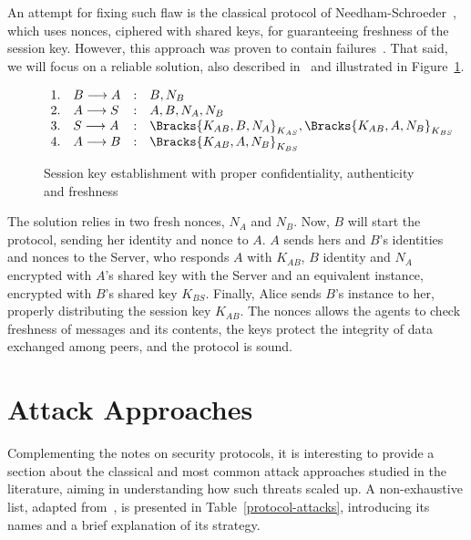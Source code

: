 An attempt for fixing such flaw is the classical protocol of Needham-Schroeder~\cite{NeedhamSchroeder78}, which uses nonces, ciphered with shared keys, for guaranteeing freshness of the session key. However, this approach was proven to contain failures~\cite{Lowe96}. That said, we will focus on a reliable solution, also described in~\cite{BoydMathuria2008} and illustrated in Figure~\ref{prt:session-key-complete}.

\begin{figure}[ht]\label{prt:session-key-complete}
  \centering
  \[
    \begin{array}{rlcl}
      1. & B \longrightarrow A &:& B, N_B \\
      2. & A \longrightarrow S &:& A, B, N_A, N_B \\
      3. & S \longrightarrow A &:& \Bracks{K_{AB}, B, N_A}_{K_{AS}}, \Bracks{K_{AB}, A, N_B}_{K_{BS}} \\
      4. & A \longrightarrow B &:& \Bracks{K_{AB}, A, N_B}_{K_{BS}} \\
    \end{array}
  \]
  \caption{Session key establishment with proper confidentiality, authenticity and freshness}
\end{figure}

The solution relies in two fresh nonces, \(N_A\) and \(N_B\). Now, \(B\) will start the protocol, sending her identity and nonce to \(A\). \(A\) sends hers and \(B\)'s identities and nonces to the Server, who responds \(A\) with \(K_{AB}\), \(B\) identity and \(N_A\) encrypted with \(A\)'s shared key with the Server and an equivalent instance, encrypted with \(B\)'s shared key \(K_{BS}\). Finally, Alice sends \(B\)'s instance to her, properly distributing the session key \(K_{AB}\). The nonces allows the agents to check freshness of messages and its contents, the keys protect the integrity of data exchanged among peers, and the protocol is sound.





\section{Attack Approaches}
Complementing the notes on security protocols, it is interesting to provide a section about the classical and most common attack approaches studied in the literature, aiming in understanding how such threats scaled up. A non-exhaustive list, adapted from~\cite{BoydMathuria2008}, is presented in Table~\ref{protocol-attacks}, introducing its names and a brief explanation of its strategy.


